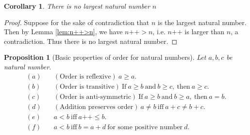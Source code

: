 \documentclass[a4paper]{book}
\newtheorem*{proof}{\textit{Proof.}}
\newtheorem{corollary}{Corollary}[section]
\newtheorem{proposition}{Proposition}[section]
\begin{document}
			\begin{corollary}
				There is no largest natural number $n$
			\end{corollary}
			\begin{proof}
				Suppose for the sake of contradiction that $n$ is the largest natural number. Then by Lemma \ref{lem:n++>n}, we have $n\texttt{++}>n$, i.e. $n\texttt{++}$ is larger than $n$, a contradiction. Thus there is no largest natural number.
			\end{proof}
			\begin{proposition}[Basic properties of order for natural numbers]
				\label{pro:NaturalNumberOrder}
				Let $a,b,c$ be natural number.
				\begin{align*}
					(a) &\quad(\textrm{Order is reflexive})~a \geq a.\\
					(b) &\quad(\textrm{Order is transitive})~\textrm{If}~a \geq b ~\textrm{and}~b \geq c,~\mathrm{then}~a \geq c.\\
					(c) &\quad(\textrm{Order is anti-symmetric})~\textrm{If}~a \geq b~\textrm{and}~b \geq a,~\textrm{then}~a=b.\\
					(d) &\quad(\textrm{Addition preserves order})~a \neq b ~\textrm{iff}~a+c \neq b+c.\\
					(e) &\quad a<b~\textrm{iff}~a\texttt{++}\leq b.\\
					(f) &\quad a<b~\textrm{iff}~b=a+d~\textrm{for some positive number}~d.
				\end{align*}
			\end{proposition}
\end{document}
